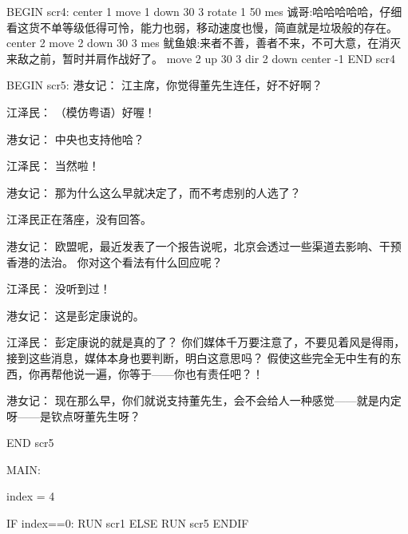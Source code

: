 BEGIN scr4:
   center 1
   move 1 down 30 3
   rotate 1 50
   mes 诚哥:哈哈哈哈哈，仔细看这货不单等级低得可怜，能力也弱，移动速度也慢，简直就是垃圾般的存在。
   center 2
   move 2 down 30 3
   mes 鱿鱼娘:来者不善，善者不来，不可大意，在消灭来敌之前，暂时并肩作战好了。
   move 2 up 30 3
   dir 2 down
   center -1
END scr4

BEGIN scr5:
     港女记： 江主席，你觉得董先生连任，好不好啊？

     江泽民： （模仿粤语）好喔！

     港女记： 中央也支持他哈？

     江泽民： 当然啦！

     港女记： 那为什么这么早就决定了，而不考虑别的人选了？

     江泽民正在落座，没有回答。

     港女记： 欧盟呢，最近发表了一个报告说呢，北京会透过一些渠道去影响、干预香港的法治。 你对这个看法有什么回应呢？

     江泽民： 没听到过！

     港女记： 这是彭定康说的。

     江泽民： 彭定康说的就是真的了？ 你们媒体千万要注意了，不要见着风是得雨，接到这些消息，媒体本身也要判断，明白这意思吗？ 假使这些完全无中生有的东西，你再帮他说一遍，你等于——你也有责任吧？！

     港女记： 现在那么早，你们就说支持董先生，会不会给人一种感觉——就是内定呀——是钦点呀董先生呀？

END scr5

MAIN:

index = 4

IF index==0:
 RUN scr1
ELSE
 RUN scr5
ENDIF